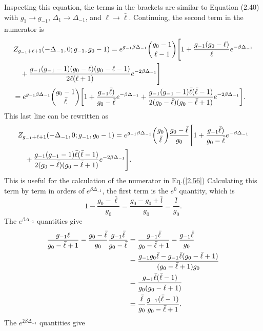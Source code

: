 Inspecting this equation, the terms in the brackets are similar to Equation (2.40) with $g_1\xrightarrow[]{}g_{-1}$, $\Delta_1\xrightarrow[]{}\Delta_{-1}$, and $\ell \xrightarrow[]{}\bar{\ell}$. Continuing, the second term in the numerator is
\begin{align}
    &Z_{g_{-1}+\ell+1}(-\Delta_{-1},0;g_{-1},g_0-1)=e^{g_{-1}\beta\Delta_{-1}}{g_0-1\choose \ell-1}\Biggr[1+\frac{g_{-1}(g_0-\ell)}{\ell}e^{-\beta\Delta_{-1}}\nonumber\\
    &\quad+\frac{g_{-1}(g_{-1}-1)(g_0-\ell)(g_0-\ell-1)}{2\ell(\ell+1)}e^{-2\beta\Delta_{-1}}\Biggr]\nonumber\\
    &=e^{g_{-1}\beta\Delta_{-1}}{g_0-1\choose \Bar{\ell}} \qty[1+\frac{g_{-1}\Bar{\ell})}{g_0-\Bar{\ell}}e^{-\beta\Delta_{-1}}+\frac{g_{-1}(g_{-1}-1)\Bar{\ell}(\Bar{\ell}-1)}{2(g_0-\Bar{\ell})(g_0-\Bar{\ell}+1)}e^{-2\beta\Delta_{-1}}].
\end{align}
This last line can be rewritten as 
\begin{align}
    &Z_{g_{-1}+\ell+1}(-\Delta_{-1},0;g_{-1},g_0-1)=e^{g_{-1}\beta\Delta_{-1}}{g_0\choose \Bar{\ell}} \frac{g_0-\bar{\ell}}{g_0} \Biggr[1+\frac{g_{-1}\Bar{\ell})}{g_0-\Bar{\ell}}e^{-\beta\Delta_{-1}}\nonumber\\
    &\quad+\frac{g_{-1}(g_{-1}-1)\Bar{\ell}(\Bar{\ell}-1)}{2(g_0-\Bar{\ell})(g_0-\Bar{\ell}+1)}e^{-2\beta\Delta_{-1}}\Biggr].
\end{align}
This is useful for the calculation of the numerator in Eq.\@ (\ref{2.56}) Calculating this term by term in orders of $e^{\beta\Delta_{-1}}$, the first term is the $e^0$ quantity, which is 
\begin{equation}
    1-\frac{g_0-\bar{\ell}}{g_0}=\frac{g_0-g_0+\bar{l}}{g_0}=\frac{\bar{l}}{g_0}.
\end{equation}
The $e^{\beta\Delta_{-1}}$ quantities give
\begin{align}
    \frac{g_{-1}\ell}{g_0-\Bar{\ell}+1}-\frac{g_0-\Bar{\ell}}{g_0}\frac{g_{-1}\bar{\ell}}{g_0-\bar{\ell}}&=\frac{g_{-1}\bar{\ell}}{g_0-\bar{\ell}+1}-\frac{g_{-1}\bar{\ell}}{g_0}\nonumber\\
    &=\frac{g_{-1}g_0\bar{\ell}-g_{-1}\bar{\ell}(g_0-\bar{\ell}+1)}{(g_0-\bar{\ell}+1)g_0}\nonumber\\
    &=\frac{g_{-1}\bar{\ell}(\bar{\ell}-1)}{g_0(g_0-\bar{\ell}+1)}\nonumber\\
    &=\frac{\bar{\ell}}{g_0} \frac{g_{-1}(\bar{\ell}-1)}{g_0-\bar{\ell}+1}.
\end{align}
The $e^{2\beta\Delta_{-1}}$ quantities give
